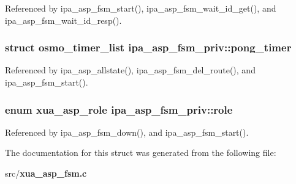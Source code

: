 Referenced by ipa\+\_\+asp\+\_\+fsm\+\_\+start(), ipa\+\_\+asp\+\_\+fsm\+\_\+wait\+\_\+id\+\_\+get(), and ipa\+\_\+asp\+\_\+fsm\+\_\+wait\+\_\+id\+\_\+resp().

\subsubsection[{pong\+\_\+timer}]{\setlength{\rightskip}{0pt plus 5cm}struct osmo\+\_\+timer\+\_\+list ipa\+\_\+asp\+\_\+fsm\+\_\+priv\+::pong\+\_\+timer}\label{structipa__asp__fsm__priv_af87f780b0d004f3887c4ea86fcc14071}


Referenced by ipa\+\_\+asp\+\_\+allstate(), ipa\+\_\+asp\+\_\+fsm\+\_\+del\+\_\+route(), and ipa\+\_\+asp\+\_\+fsm\+\_\+start().

\subsubsection[{role}]{\setlength{\rightskip}{0pt plus 5cm}enum {\bf xua\+\_\+asp\+\_\+role} ipa\+\_\+asp\+\_\+fsm\+\_\+priv\+::role}\label{structipa__asp__fsm__priv_af574f7a7e206bfe6e18190a5d51d95df}


Referenced by ipa\+\_\+asp\+\_\+fsm\+\_\+down(), and ipa\+\_\+asp\+\_\+fsm\+\_\+start().



The documentation for this struct was generated from the following file\+:\begin{DoxyCompactItemize}
\item 
src/{\bf xua\+\_\+asp\+\_\+fsm.\+c}\end{DoxyCompactItemize}
